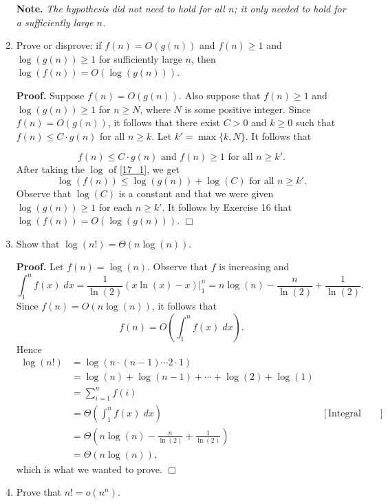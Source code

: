 \documentclass[9pt]{article}
\newcommand{\qed}{\hfill \ensuremath{\Box}}
\begin{document}
\begin{enumerate}
      \textbf{Note.} \textit{The hypothesis did not need to hold for all $n$; it 
      only needed to hold for a sufficiently large $n$.}
   \item Prove or disprove: if $f(n) = O(g(n))$ and $f(n) \ge 1$ and
         $\log(g(n)) \ge 1$ for sufficiently large $n$, then
         $\log(f(n)) = O(\log(g(n)))$.

      \textbf{Proof.} Suppose $f(n) = O(g(n))$. Also suppose that $f(n) \ge 1$
      and $\log(g(n)) \ge 1$ for $n \ge N$, where $N$ is some positive integer.
      Since $f(n) = O(g(n))$, it follows that there exist $C > 0$ and $k \ge 0$
      such that $f(n) \le C \cdot g(n)$ for all $n \ge k$. Let
      $k' = \max\{k, N\}$. It follows that 

      \begin{equation} \label{17_1}
         f(n) \le C \cdot g(n) \text{ and } f(n) \ge 1 \text{ for all }n \ge k'.
      \end{equation}
      After taking the $\log$ of \eqref{17_1}, we get
      $$\log(f(n)) \le \log(g(n)) + \log(C) \text{ for all }n \ge k'.$$
      Observe that $\log(C)$ is a constant and that we were given
      $\log(g(n)) \ge 1$ for each $n \ge k'$. It follows by Exercise 16 that
      $\log(f(n)) = O(\log(g(n)))$. \qed
   \item Show that $\log(n!) = \Theta(n\log(n))$.

      \textbf{Proof.} Let $f(n) = \log(n)$. Observe that $f$ is increasing and
      $$\int_1^nf(x)\;dx = \frac{1}{\ln(2)}(x\ln(x) - x) \bigg|_1^n =
         n\log(n) - \frac{n}{\ln(2)} + \frac{1}{\ln(2)}.$$
      Since $f(n) = O(n\log(n))$, it follows that
      $$f(n) = O\left(\int_1^nf(x)\;dx\right).$$
      Hence
      \begin{align*}
         \log(n!) &= \log(n \cdot (n - 1) \cdots 2 \cdot 1) \\
            &= \log(n) + \log(n-1) + \cdots + \log(2) + \log(1) \\
            &= \sum_{i=1}^nf(i) \\
            &= \Theta\left(\int_1^nf(x)\;dx\right) &[\text{Integral Theorem}] \\
            &= \Theta\left(n\log(n) - \frac{n}{\ln(2)} +
                  \frac{1}{\ln(2)}\right) \\
            &= \Theta(n\log(n)),
      \end{align*}
      which is what we wanted to prove. \qed
   \item Prove that $n! = o(n^n)$.


\end{enumerate}
\end{document}
